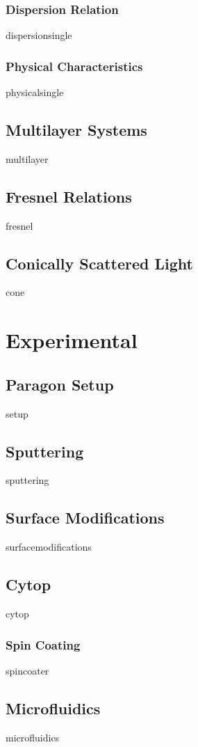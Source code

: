 \documentclass[a4paper,titlepage,onecolumn]{report}
\begin{document}
\subsection{Dispersion Relation}
{dispersionsingle}
\subsection{Physical Characteristics}
{physicalsingle}
\section{Multilayer Systems}
{multilayer}
\section{Fresnel Relations}
{fresnel}
\section{Conically Scattered Light}\label{sec:coneexist}
{cone}

\chapter{Experimental} \label{ch:experimental}
\section{Paragon Setup}
{setup}
\section{Sputtering}
{sputtering}
\section{Surface Modifications}
{surfacemodifications}
\section{Cytop}
{cytop}
\subsection{Spin Coating}
{spincoater}
\section{Microfluidics}
{microfluidics}
\end{document}
